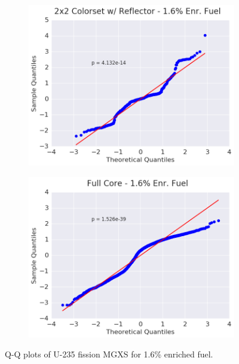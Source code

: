 \begin{figure}[h!]
\begin{subfigure}{0.5\textwidth}
  \centering
  \includegraphics[width=\linewidth]{figures/patterns/reflector/quantile/16-enr-fiss-2}  \caption{}
  \label{fig:chap9-qq-reflector-1.6-fiss}
\end{subfigure}%
\begin{subfigure}{0.5\textwidth}
  \centering
  \includegraphics[width=\linewidth]{figures/patterns/full-core/quantile/16-enr-fiss-2} \caption{}
  \label{fig:chap9-qq-full-core-1.6-fiss}
\end{subfigure}
\caption[Q-Q plots of U-235 fission MGXS for 1.6\% enriched fuel]{Q-Q plots of U-235 fission \ac{MGXS} for 1.6\% enriched fuel.}
\label{fig:chap9-qq-1.6-fiss}
\end{figure}

